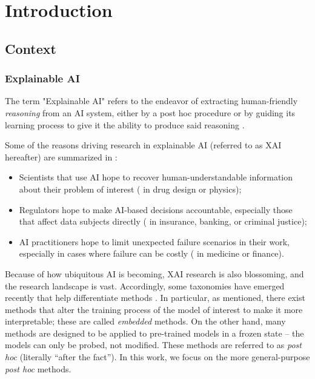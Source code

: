 \documentclass[../main.tex]{subfiles}
\begin{document}
\chapter{Introduction}
\label{ch:introduction}

\section{Context}

\subsection{Explainable AI}

The term "Explainable AI" refers to the endeavor of extracting human-friendly \emph{reasoning} from an AI system, either by a post hoc procedure or by guiding its learning process to give it the ability to produce said reasoning \cite{zhangSurvey2021}.

Some of the reasons driving research in explainable AI (referred to as XAI hereafter) are summarized in \cite{zhangSurvey2021}:
\begin{itemize}
    \item Scientists that use AI hope to recover human-understandable information about their problem of interest (\eg{} in drug design or physics);
    \item Regulators hope to make AI-based decisions accountable, especially those that affect data subjects directly (\eg{} in insurance, banking, or criminal justice);
    \item AI practitioners hope to limit unexpected failure scenarios in their work, especially in cases where failure can be costly (\eg{} in medicine or finance).
\end{itemize}


Because of how ubiquitous AI is becoming, XAI research is also blossoming, and the research landscape is vast.
Accordingly, some taxonomies have emerged recently that help differentiate methods \cite{zhangSurvey2021, bellePrinciples2021}.
In particular, as mentioned, there exist methods that alter the training process of the model of interest to make it more interpretable; these are called \emph{embedded} methods.
On the other hand, many methods are designed to be applied to pre-trained models in a frozen state -- the models can only be probed, not modified. These methods are referred to as \textsl{post hoc} (literally ``after the fact'').
In this work, we focus on the more general-purpose \textsl{post hoc} methods.
\end{document}

